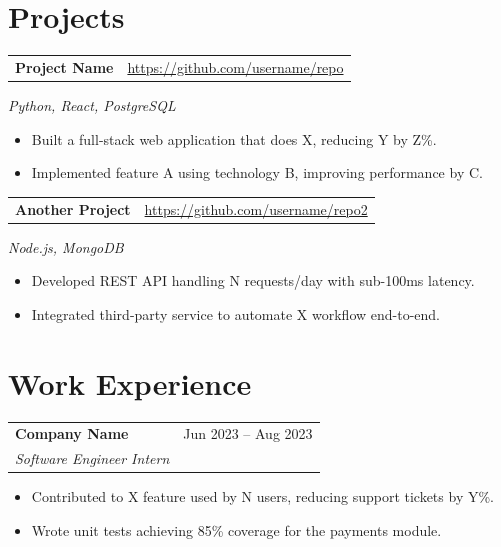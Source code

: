 \documentclass[10pt, a4paper]{article}
\makeatletter
\newcommand{\projectentry}[4]{%
  \noindent
  \begin{tabularx}{\linewidth}{@{}X r@{}}
    \textbf{#1} & \href{#3}{\textcolor{subtle}{\small #3}}
  \end{tabularx}
  \vspace{1pt}
  \textcolor{subtle}{\small \textit{#2}}
  \vspace{1pt}
  #4
  \vspace{6pt}
}
\newcommand{\workentry}[4]{%
  \noindent
  \begin{tabularx}{\linewidth}{@{}X r@{}}
    \textbf{#1} & \textcolor{subtle}{\small #3} \\
    \textit{\small #2} &
  \end{tabularx}
  \vspace{1pt}
  #4
  \vspace{6pt}
}
\makeatother
\begin{document}
\section{Projects}
\projectentry{Project Name}{Python, React, PostgreSQL}{https://github.com/username/repo}{%
  \begin{itemize}
    \item Built a full-stack web application that does X, reducing Y by Z\%.
    \item Implemented feature A using technology B, improving performance by C.
  \end{itemize}
}

\projectentry{Another Project}{Node.js, MongoDB}{https://github.com/username/repo2}{%
  \begin{itemize}
    \item Developed REST API handling N requests/day with sub-100ms latency.
    \item Integrated third-party service to automate X workflow end-to-end.
  \end{itemize}
}

\section{Work Experience}
\workentry{Company Name}{Software Engineer Intern}{Jun 2023 -- Aug 2023}{%
  \begin{itemize}
    \item Contributed to X feature used by N users, reducing support tickets by Y\%.
    \item Wrote unit tests achieving 85\% coverage for the payments module.
  \end{itemize}
}

\end{document}
